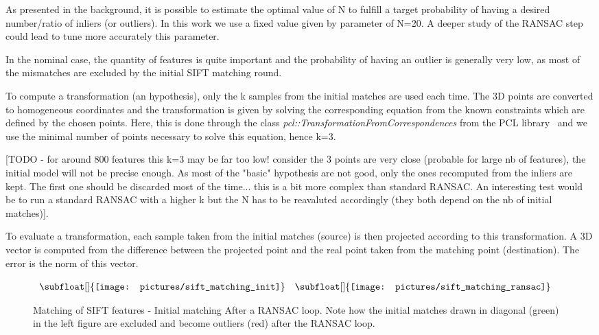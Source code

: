 As presented in the background, it is possible to estimate the optimal value of N to fulfill a target probability of having a desired number/ratio of inliers (or outliers). In this work we use a fixed value given by parameter of N=20. A deeper study of the RANSAC step could lead to tune more accurately this parameter.

In the nominal case, the quantity of features is quite important and the probability of having an outlier is generally very low, as most of the mismatches are excluded by the initial SIFT matching round.



To compute a transformation (an hypothesis), only the k samples from the initial matches are used each time. The 3D points are converted to homogeneous coordinates and the transformation is given by solving the corresponding equation from the known constraints which are defined by the chosen points. Here, this is done through the class \emph{pcl::TransformationFromCorrespondences} from the PCL library~\cite{Rusu_ICRA2011_PCL} and we use the minimal number of points necessary to solve this equation, hence k=3.

[TODO - for around 800 features this k=3 may be far too low! consider the 3 points are very close (probable for large nb of features), the initial model will not be precise enough. As most of the "basic" hypothesis are not good, only the ones recomputed from the inliers are kept. The first one should be discarded most of the time... this is a bit more complex than standard RANSAC. An interesting test would be to run a standard RANSAC with a higher k but the N has to be reavaluted accordingly (they both depend on the nb of initial matches)].

To evaluate a transformation, each sample taken from the initial matches (source) is then projected according to this transformation. A 3D vector is computed from the difference between the projected point and the real point taken from the matching point (destination). The error is the norm of this vector.

\begin{figure}[h!]
\centering$
\begin{array}{cc}
\subfloat[]{\label{fig:sift_match_1} \texttt{[image: pictures/sift\_matching\_init]}} &
\subfloat[]{\label{fig:sift_match_2} \texttt{[image: pictures/sift\_matching\_ransac]}}
\end{array}$
\caption{Matching of SIFT features -  Initial matching  After a RANSAC loop. Note how the initial matches drawn in diagonal (green) in the left figure are excluded and become outliers (red) after the RANSAC loop.}
\end{figure}

